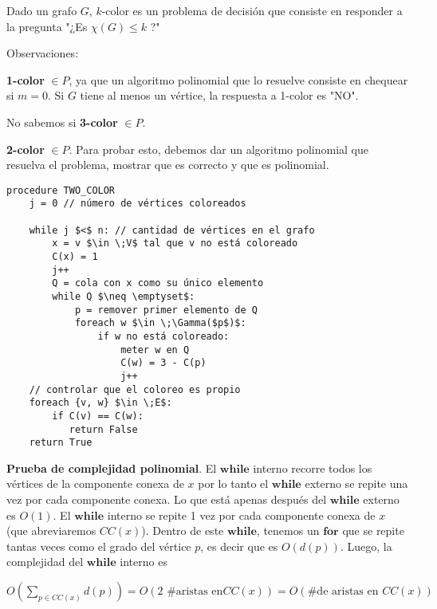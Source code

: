 \documentclass[10pt,a4paper]{article}
\begin{document}
Dado un grafo $G$, $k$-color es un problema de decisión que consiste en responder a la pregunta "¿Es $\chi(G) \leq k$ ?"

Observaciones:

\textbf{1-color} $\in P$, ya que un algoritmo polinomial que lo resuelve consiste en chequear si $m=0$. Si $G$ tiene al menos un vértice, la respuesta a 1-color es "NO".

No sabemos si \textbf{3-color} $\in P$.

\textbf{2-color} $\in P$. Para probar esto, debemos dar un algoritmo polinomial que resuelva el problema, mostrar que es correcto y que es polinomial.


    \begin{lstlisting}[language=pseudo]
procedure TWO_COLOR
    j = 0 // número de vértices coloreados

    while j $<$ n: // cantidad de vértices en el grafo
        x = v $\in \;V$ tal que v no está coloreado
        C(x) = 1
        j++
        Q = cola con x como su único elemento
        while Q $\neq \emptyset$:
            p = remover primer elemento de Q
            foreach w $\in \;\Gamma($p$)$:
                if w no está coloreado:
                    meter w en Q
                    C(w) = 3 - C(p)
                    j++
    // controlar que el coloreo es propio
    foreach {v, w} $\in \;E$:
        if C(v) == C(w):
           return False
    return True
\end{lstlisting}

\textbf{Prueba de complejidad polinomial}. El $\textbf{while}$ interno recorre todos los vértices de la componente conexa de $x$ por lo tanto el $\textbf{while}$ externo se repite una vez por cada componente conexa. Lo que está apenas después del $\textbf{while}$ externo es $O(1)$. El $\textbf{while}$ interno se repite 1 vez por cada componente conexa de $x$ (que abreviaremos $CC(x)$). Dentro de este $\textbf{while}$, tenemos un $\textbf{for}$ que se repite tantas veces como el grado del vértice $p$, es decir que es $O(d(p))$. Luego, la complejidad del $\textbf{while}$ interno es

\begin{center}
$O(\sum_{p \in CC(x)}d(p)) = O(2\text{ \# aristas en} CC(x)) = O(\text{\# de aristas en }CC(x))$
\end{center}
\end{document}
